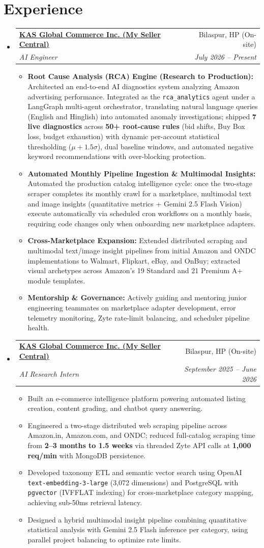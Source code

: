 \documentclass[letterpaper,10pt]{article}
\makeatletter
\newcommand{\resumeItem}[1]{\item\small{#1}}
\newcommand{\resumeSubheading}[4]{
\vspace{-1pt}\item
  \begin{tabular*}{0.97\textwidth}[t]{l@{\extracolsep{\fill}}r}
    \textbf{#1} & #2 \\
    \textit{#3} & \textit{#4} \\
  \end{tabular*}\vspace{-7pt}
}
\newcommand{\resumeSubHeadingList}{\begin{itemize}[leftmargin=0.15in, label={}]}
\newcommand{\resumeSubHeadingListEnd}{\end{itemize}}
\newcommand{\resumeItemListStart}{\begin{itemize}[leftmargin=0.25in]}
\newcommand{\resumeItemListEnd}{\end{itemize}\vspace{-6pt}}
\makeatother
\begin{document}
\section{Experience}
\resumeSubHeadingList
  \resumeSubheading
      {\href{https://mysellercentral.com/}{KAS Global Commerce Inc. (My Seller Central)}}{Bilaspur, HP (On-site)}
      {AI Engineer}{July 2026 -- Present}
      \resumeItemListStart
          \resumeItem{\textbf{Root Cause Analysis (RCA) Engine (Research to Production):} Architected an end-to-end AI diagnostics system analyzing Amazon advertising performance. Integrated as the \texttt{rca\_analytics} agent under a LangGraph multi-agent orchestrator, translating natural language queries (English and Hinglish) into automated anomaly investigations; shipped \textbf{7 live diagnostics} across \textbf{50+ root-cause rules} (bid shifts, Buy Box loss, budget exhaustion) with dynamic per-account statistical thresholding ($\mu + 1.5\sigma$), dual baseline windows, and automated negative keyword recommendations with over-blocking protection.}
          \resumeItem{\textbf{Automated Monthly Pipeline Ingestion \& Multimodal Insights:} Automated the production catalog intelligence cycle: once the two-stage scraper completes its monthly crawl for a marketplace, multimodal text and image insights (quantitative metrics + Gemini 2.5 Flash Vision) execute automatically via scheduled cron workflows on a monthly basis, requiring code changes only when onboarding new marketplace adapters.}
          \resumeItem{\textbf{Cross-Marketplace Expansion:} Extended distributed scraping and multimodal text/image insight pipelines from initial Amazon and ONDC implementations to Walmart, Flipkart, eBay, and OnBuy; extracted visual archetypes across Amazon's 19 Standard and 21 Premium A+ module templates.}
          \resumeItem{\textbf{Mentorship \& Governance:} Actively guiding and mentoring junior engineering teammates on marketplace adapter development, error telemetry monitoring, Zyte rate-limit balancing, and scheduler pipeline health.}
      \resumeItemListEnd

  \resumeSubheading
      {\href{https://mysellercentral.com/}{KAS Global Commerce Inc. (My Seller Central)}}{Bilaspur, HP (On-site)}
      {AI Research Intern}{September 2025 -- June 2026}
      \resumeItemListStart
          \resumeItem{Built an e-commerce intelligence platform powering automated listing creation, content grading, and chatbot query answering.}
          \resumeItem{Engineered a two-stage distributed web scraping pipeline across Amazon.in, Amazon.com, and ONDC; reduced full-catalog scraping time from \textbf{2--3 months to 1.5 weeks} via threaded Zyte API calls at \textbf{1,000 req/min} with MongoDB persistence.}
          \resumeItem{Developed taxonomy ETL and semantic vector search using OpenAI \texttt{text-embedding-3-large} (3,072 dimensions) and PostgreSQL with \texttt{pgvector} (IVFFLAT indexing) for cross-marketplace category mapping, achieving sub-50ms retrieval latency.}
          \resumeItem{Designed a hybrid multimodal insight pipeline combining quantitative statistical analysis with Gemini 2.5 Flash inference per category, using parallel project balancing to optimize rate limits.}
      \resumeItemListEnd
\resumeSubHeadingListEnd
\end{document}
